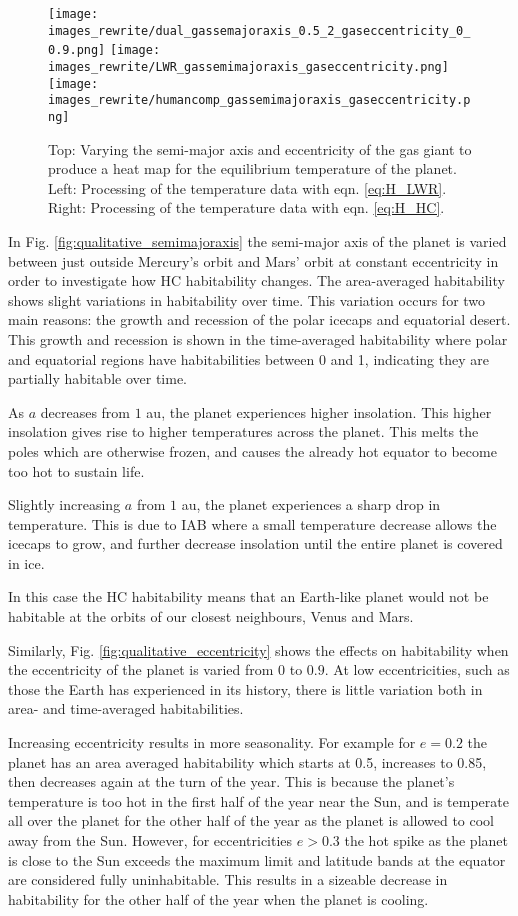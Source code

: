 \documentclass[12pt, onecolumn]{revtex4-2}    %
\begin{document}
\begin{figure}[t]
  \texttt{[image: images\_rewrite/dual\_gassemajoraxis\_0.5\_2\_gaseccentricity\_0\_0.9.png]}
  \texttt{[image: images\_rewrite/LWR\_gassemimajoraxis\_gaseccentricity.png]}
  \texttt{[image: images\_rewrite/humancomp\_gassemimajoraxis\_gaseccentricity.png]}
  \caption{
    Top: Varying the semi-major axis and eccentricity of the gas giant to produce a heat map for the equilibrium temperature of the planet.
    Left: Processing of the temperature data with eqn. \eqref{eq:H_LWR}.
    Right: Processing of the temperature data with eqn. \eqref{eq:H_HC}.
  }
  \label{fig:qualitative_semimajoraxis_eccentricity}
\end{figure}

In Fig. \ref{fig:qualitative_semimajoraxis} the semi-major axis of the planet is varied between just outside Mercury's orbit and Mars' orbit at constant eccentricity in order to investigate how HC habitability changes.
The area-averaged habitability shows slight variations in habitability over time.
This variation occurs for two main reasons: the growth and recession of the polar icecaps and equatorial desert.
This growth and recession is shown in the time-averaged habitability where polar and equatorial regions have habitabilities between 0 and 1, indicating they are partially habitable over time.

As $a$ decreases from $1$ au, the planet experiences higher insolation.
This higher insolation gives rise to higher temperatures across the planet.
This melts the poles which are otherwise frozen, and causes the already hot equator to become too hot to sustain life.

Slightly increasing $a$ from $1$ au, the planet experiences a sharp drop in temperature.
This is due to IAB where a small temperature decrease allows the icecaps to grow, and further decrease insolation until the entire planet is covered in ice.

In this case the HC habitability means that an Earth-like planet would not be habitable at the orbits of our closest neighbours, Venus and Mars.


Similarly, Fig. \ref{fig:qualitative_eccentricity} shows the effects on habitability when the eccentricity of the planet is varied from $0$ to $0.9$.
At low eccentricities, such as those the Earth has experienced in its history, there is little variation both in area- and time-averaged habitabilities.

Increasing eccentricity results in more seasonality.
For example for $e=0.2$ the planet has an area averaged habitability which starts at 0.5, increases to 0.85, then decreases again at the turn of the year.
This is because the planet's temperature is too hot in the first half of the year near the Sun, and is temperate all over the planet for the other half of the year as the planet is allowed to cool away from the Sun.
However, for eccentricities $e>0.3$ the hot spike as the planet is close to the Sun exceeds the maximum limit and latitude bands at the equator are considered fully uninhabitable.
This results in a sizeable decrease in habitability for the other half of the year when the planet is cooling.
\end{document}
